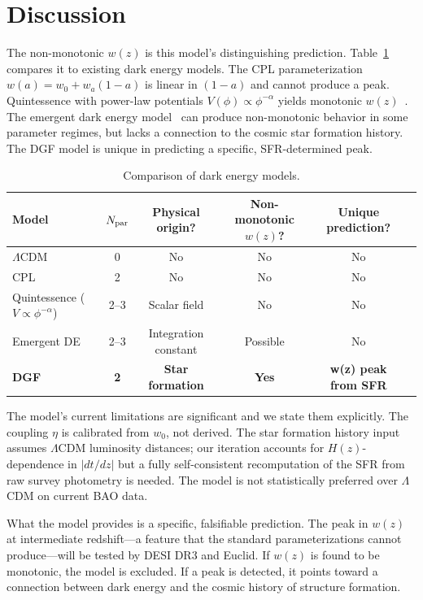 \documentclass[12pt,a4paper]{article}
\begin{document}
\section*{Discussion}

The non-monotonic $w(z)$ is this model's distinguishing prediction. Table~\ref{tab:competitors} compares it to existing dark energy models. The CPL parameterization $w(a)=w_0+w_a(1-a)$ is linear in $(1-a)$ and cannot produce a peak. Quintessence with power-law potentials $V(\phi)\propto\phi^{-\alpha}$ yields monotonic $w(z)$~\cite{tsujikawa2013}. The emergent dark energy model~\cite{li2024} can produce non-monotonic behavior in some parameter regimes, but lacks a connection to the cosmic star formation history. The DGF model is unique in predicting a specific, SFR-determined peak.

\begin{table}[htbp]
\centering
\caption{Comparison of dark energy models.}
\label{tab:competitors}
\begin{tabular}{lccccc}
\toprule
Model & $N_{\rm par}$ & Physical origin? & Non-monotonic $w(z)$? & Unique prediction? \\
\midrule
$\Lambda$CDM & 0 & No & No & No \\
CPL & 2 & No & No & No \\
Quintessence ($V\propto\phi^{-\alpha}$) & 2--3 & Scalar field & No & No \\
Emergent DE & 2--3 & Integration constant & Possible & No \\
{\bf DGF} & {\bf 2} & {\bf Star formation} & {\bf Yes} & {\bf w(z) peak from SFR} \\
\bottomrule
\end{tabular}
\end{table}

The model's current limitations are significant and we state them explicitly. The coupling $\eta$ is calibrated from $w_0$, not derived. The star formation history input assumes $\Lambda$CDM luminosity distances; our iteration accounts for $H(z)$-dependence in $|dt/dz|$ but a fully self-consistent recomputation of the SFR from raw survey photometry is needed. The model is not statistically preferred over $\Lambda$CDM on current BAO data.

What the model provides is a specific, falsifiable prediction. The peak in $w(z)$ at intermediate redshift---a feature that the standard parameterizations cannot produce---will be tested by DESI DR3 and Euclid. If $w(z)$ is found to be monotonic, the model is excluded. If a peak is detected, it points toward a connection between dark energy and the cosmic history of structure formation.
\end{document}

